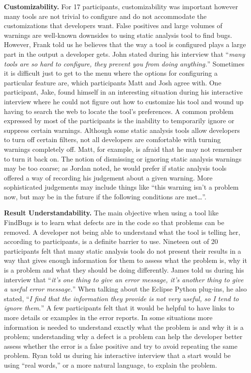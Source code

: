\textbf{Customizability.}
For 17 participants, customizability was important however many tools are
not trivial to configure and do not accommodate the customizations that
developers want. False positives and large volumes of warnings are well-known
downsides to using static analysis tool to find bugs. However, Frank told us he
believes that the way a tool is configured plays a large part in the output
a developer gets. John stated during his interview that ``\emph{many tools are so hard to
configure, they prevent you from doing anything.}'' Sometimes it is difficult
just to get to the menu where the options for configuring a particular feature
are, which participants Matt and Josh agree with. One participant, Jake,
found himself in an interesting situation during his interactive interview where
he could not figure out how to customize his tool and wound up having to search
the web to locate the tool's preferences. A common problem
expressed by most of the participants is the inability to temporarily ignore or
suppress certain warnings. Although some static analysis tools allow developers
to turn off certain filters, not all developers are comfortable with turning
warnings completely off. Matt, for example, is afraid that he may not remember
to turn it back on. The notion of dismissing or ignoring static analysis
warnings may be too coarse; as Jordan noted, he would prefer if static
analysis tools offered a way of recording his judgement about a given warning. More
sophisticated judgements may include things like ``this warning isn't a problem
now, but may be in the future if the following conditions are met\ldots''.

\textbf{Result Understandability.} 
The main objective when using a tool like FindBugs is to learn what defects are
in the code so that problems can be removed. A developer not being able to
understand what the tool is telling her, according to participants, is a
definite barrier to use. Nineteen out of 20 participants felt that many static
analysis tools do not present their results in a way that gives enough
information for them to assess what the problem is, why it is a problem and what
they should be doing differently. James told us during his interview that
``\emph{it's one thing to give an error message, it's another thing to give a
useful error message.}'' When talking about the Eclipse Python plug-ins, he also
stated, ``\emph{I find that the information they provide is not very useful, so
I tend to ignore them.}'' A few participants felt that it would be helpful to
have links to more details or examples in the error reports.
In some situations more information is needed to understand exactly what the
problem is and why it is a problem; understanding why a defect is a problem can
help the developer better assess whether the error is a false positive and try
to avoid repeating the same problem. Ryan told us during
his interactive interview that a start would be using ``real words,'' or a more
natural language, to explain the problem.

